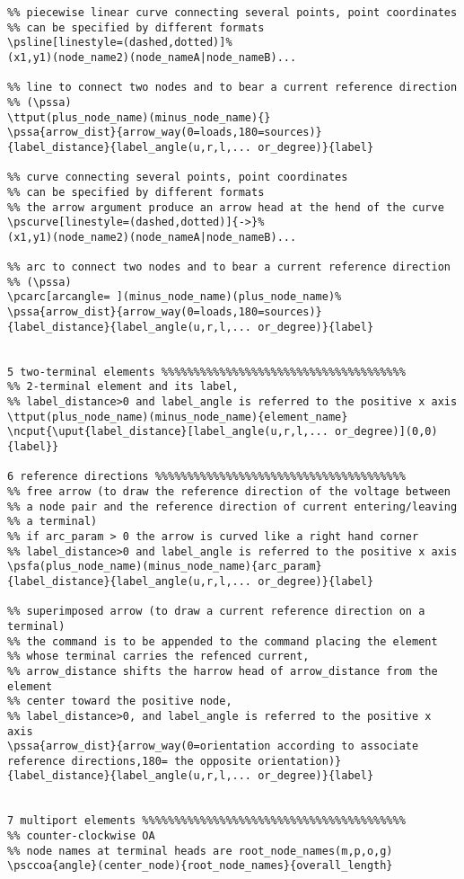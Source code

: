 \documentclass[12pt,a4paper]{article}
\begin{document}
\begin{verbatim}
%% piecewise linear curve connecting several points, point coordinates
%% can be specified by different formats
\psline[linestyle=(dashed,dotted)]%
(x1,y1)(node_name2)(node_nameA|node_nameB)...

%% line to connect two nodes and to bear a current reference direction
%% (\pssa)
\ttput(plus_node_name)(minus_node_name){}
\pssa{arrow_dist}{arrow_way(0=loads,180=sources)}
{label_distance}{label_angle(u,r,l,... or_degree)}{label}

%% curve connecting several points, point coordinates
%% can be specified by different formats
%% the arrow argument produce an arrow head at the hend of the curve
\pscurve[linestyle=(dashed,dotted)]{->}%
(x1,y1)(node_name2)(node_nameA|node_nameB)...

%% arc to connect two nodes and to bear a current reference direction
%% (\pssa)
\pcarc[arcangle= ](minus_node_name)(plus_node_name)%
\pssa{arrow_dist}{arrow_way(0=loads,180=sources)}
{label_distance}{label_angle(u,r,l,... or_degree)}{label}


5 two-terminal elements %%%%%%%%%%%%%%%%%%%%%%%%%%%%%%%%%%%%%%
%% 2-terminal element and its label,
%% label_distance>0 and label_angle is referred to the positive x axis
\ttput(plus_node_name)(minus_node_name){element_name}
\ncput{\uput{label_distance}[label_angle(u,r,l,... or_degree)](0,0){label}}

6 reference directions %%%%%%%%%%%%%%%%%%%%%%%%%%%%%%%%%%%%%%%
%% free arrow (to draw the reference direction of the voltage between
%% a node pair and the reference direction of current entering/leaving
%% a terminal)
%% if arc_param > 0 the arrow is curved like a right hand corner
%% label_distance>0 and label_angle is referred to the positive x axis
\psfa(plus_node_name)(minus_node_name){arc_param}
{label_distance}{label_angle(u,r,l,... or_degree)}{label}

%% superimposed arrow (to draw a current reference direction on a terminal)
%% the command is to be appended to the command placing the element
%% whose terminal carries the refenced current,
%% arrow_distance shifts the harrow head of arrow_distance from the element
%% center toward the positive node,
%% label_distance>0, and label_angle is referred to the positive x axis
\pssa{arrow_dist}{arrow_way(0=orientation according to associate reference directions,180= the opposite orientation)}
{label_distance}{label_angle(u,r,l,... or_degree)}{label}


7 multiport elements %%%%%%%%%%%%%%%%%%%%%%%%%%%%%%%%%%%%%%%%%
%% counter-clockwise OA
%% node names at terminal heads are root_node_names(m,p,o,g)
\psccoa{angle}(center_node){root_node_names}{overall_length}


\end{verbatim}
\end{document}
